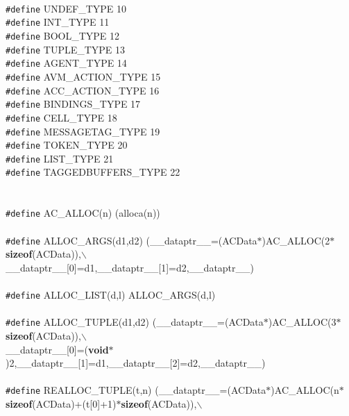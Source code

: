 \begin{flushleft}
\mbox{}\\
{\tt \#define} UNDEF\_TYPE            10\mbox{}\\
{\tt \#define} INT\_TYPE              11\mbox{}\\
{\tt \#define} BOOL\_TYPE             12\mbox{}\\
{\tt \#define} TUPLE\_TYPE            13\mbox{}\\
{\tt \#define} AGENT\_TYPE            14\mbox{}\\
{\tt \#define} AVM\_ACTION\_TYPE       15\mbox{}\\
{\tt \#define} ACC\_ACTION\_TYPE       16\mbox{}\\
{\tt \#define} BINDINGS\_TYPE         17\mbox{}\\
{\tt \#define} CELL\_TYPE             18\mbox{}\\
{\tt \#define} MESSAGETAG\_TYPE       19\mbox{}\\
{\tt \#define} TOKEN\_TYPE            20\mbox{}\\
{\tt \#define} LIST\_TYPE             21\mbox{}\\
{\tt \#define} TAGGEDBUFFERS\_TYPE    22\mbox{}\\
\mbox{}\\
\mbox{}\\
{\tt \#define} AC\_ALLOC(n) (alloca(n))\mbox{}\\
\mbox{}\\
{\tt \#define} ALLOC\_ARGS(d1,d2) (\_\_dataptr\_\_=(ACData$\ast$)AC\_ALLOC(2$\ast${\bf sizeof}(ACData)),$\backslash$\\
\hspace*{27\indentation}\_\_dataptr\_\_[0]=d1,\_\_dataptr\_\_[1]=d2,\_\_dataptr\_\_)\mbox{}\\
\mbox{}\\
{\tt \#define} ALLOC\_LIST(d,l) ALLOC\_ARGS(d,l)\mbox{}\\
\mbox{}\\
{\tt \#define} ALLOC\_TUPLE(d1,d2) (\_\_dataptr\_\_=(ACData$\ast$)AC\_ALLOC(3$\ast${\bf sizeof}(ACData)),$\backslash$\\
\hspace*{28\indentation}\_\_dataptr\_\_[0]=({\bf void}$\ast$)2,\_\_dataptr\_\_[1]=d1,\_\_dataptr\_\_[2]=d2,\_\_dataptr\_\_)\mbox{}\\
\mbox{}\\
{\tt \#define} REALLOC\_TUPLE(t,n) (\_\_dataptr\_\_=(ACData$\ast$)AC\_ALLOC(n$\ast${\bf sizeof}(ACData)+(t[0]+1)$\ast${\bf sizeof}(ACData)),$\backslash$\\

\end{flushleft}
